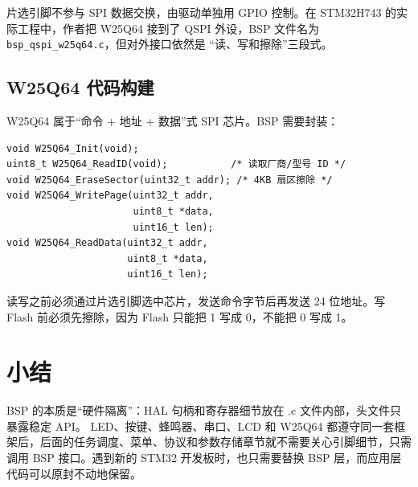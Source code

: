 片选引脚不参与 SPI 数据交换，由驱动单独用 GPIO 控制。在 STM32H743 的实际工程中，作者把 W25Q64 接到了 QSPI 外设，BSP 文件名为 \texttt{bsp\_qspi\_w25q64.c}，但对外接口依然是 “读、写和擦除”三段式。

\subsection{W25Q64 代码构建}

W25Q64 属于“命令 + 地址 + 数据”式 SPI 芯片。BSP 需要封装：

\begin{lstlisting}[style=c]
void W25Q64_Init(void);
uint8_t W25Q64_ReadID(void);           /* 读取厂商/型号 ID */
void W25Q64_EraseSector(uint32_t addr); /* 4KB 扇区擦除 */
void W25Q64_WritePage(uint32_t addr,
                      uint8_t *data,
                      uint16_t len);
void W25Q64_ReadData(uint32_t addr,
                     uint8_t *data,
                     uint16_t len);
\end{lstlisting}

读写之前必须通过片选引脚选中芯片，发送命令字节后再发送 24 位地址。写 Flash 前必须先擦除，因为 Flash 只能把 1 写成 0，不能把 0 写成 1。

\section{小结}

BSP 的本质是“硬件隔离”：HAL 句柄和寄存器细节放在 .c 文件内部，头文件只暴露稳定 API。 LED、按键、蜂鸣器、串口、LCD 和 W25Q64 都遵守同一套框架后，后面的任务调度、菜单、协议和参数存储章节就不需要关心引脚细节，只需调用 BSP 接口。遇到新的 STM32 开发板时，也只需要替换 BSP 层，而应用层代码可以原封不动地保留。